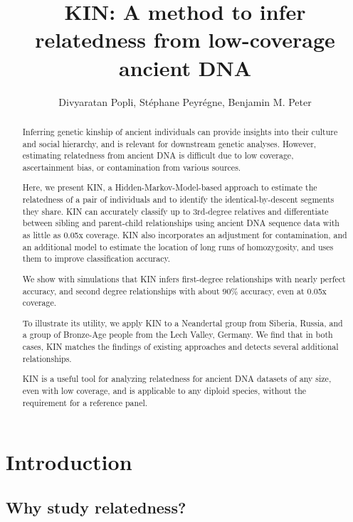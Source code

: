 \documentclass[12pt, letterpaper]{article}
\title{KIN: A method to infer relatedness from low-coverage ancient DNA}
\author{Divyaratan Popli, Stéphane Peyrégne, Benjamin M. Peter}
\begin{document}
\maketitle

\begin{abstract}

\noindent Inferring genetic kinship of ancient individuals can provide insights into their culture and social hierarchy, and is relevant for downstream genetic analyses. However, estimating relatedness from ancient DNA is difficult due to low coverage, ascertainment bias, or contamination from various sources. 

Here, we present KIN, a Hidden-Markov-Model-based approach to estimate the relatedness of a pair of individuals and to identify the identical-by-descent segments they share. KIN can accurately classify up to 3rd-degree relatives and differentiate between sibling and parent-child relationships using ancient DNA sequence data with as little as 0.05x coverage. KIN also incorporates an adjustment for contamination, and an additional model to estimate the location of long runs of homozygosity, and uses them to improve classification accuracy.

We show with simulations that KIN infers first-degree relationships with nearly perfect accuracy, and second degree relationships with about $90\%$ accuracy, even at 0.05x coverage.

To illustrate its utility, we apply KIN to a Neandertal group from Siberia, Russia, and a group of Bronze-Age people from the Lech Valley, Germany. We find that in both cases, KIN matches the findings of existing approaches and detects several additional relationships. 

KIN is a useful tool for analyzing relatedness for ancient DNA datasets of any size, even with low coverage, and is applicable to any diploid species, without the requirement for a reference panel.
\end{abstract}

\section{Introduction}

\subsection{Why study relatedness?}
\end{document}
